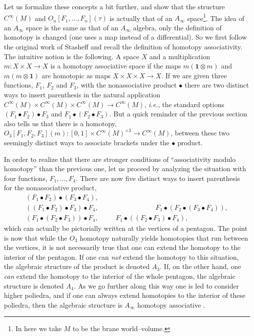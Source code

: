 \documentclass[a4paper,11pt]{article}
\begin{document}
Let us formalize these concepts a bit further, and show that the 
structure $C^{\infty}(M)$ and $O_{n}[F_{1}, \ldots, F_{n}](\tau)$ is 
actually that of an $A_{\infty}$ space\footnote{In here we take $M$ to 
be the brane world--volume.}. The idea of an $A_{\infty}$ 
space is the same as that of an $A_{\infty}$ algebra, only the definition 
of homotopy is changed (one uses a map instead of a differential). So 
we first follow the original work of Stasheff \cite{Stasheff} and 
recall the definition of homotopy associativity. The intuitive notion 
is the following. A space $X$ and a multiplication $m : X \times X \to 
X$ is a homotopy associative space if the maps $m(\mathbf{1} \otimes 
m)$ and $m(m \otimes \mathbf{1})$ are homotopic as maps $X \times X 
\times X \to X$. If we are given three functions, $F_{1}$, $F_{2}$ 
and $F_{3}$, with the nonassociative product $\bullet$ there are two 
distinct ways to insert parenthesis in the natural application 
$C^{\infty}(M) \times C^{\infty}(M) \times C^{\infty}(M) \to 
C^{\infty}(M)$, \textit{i.e.}, the standard options $\left( F_{1} 
\bullet F_{2} \right) \bullet F_{3}$ and $F_{1} \bullet \left( F_{2} \bullet 
F_{3} \right)$. But a quick reminder of the previous section also tells us 
that there is a homotopy, $O_{3} [F_{1}, F_{2}, F_{3}] (m) : [0,1] \times 
C^{\infty}(M)^{\times 3} \to C^{\infty}(M)$, between these two seemingly 
distinct ways to associate brackets under the $\bullet$ product.

In order to realize that there are stronger conditions of 
``associativity modulo homotopy'' than the previous one, let us 
proceed by analyzing the situation with four functions, $F_{1}, 
\ldots, F_{4}$. There are now five distinct ways to insert 
parenthesis for the nonassociative product,
\begin{eqnarray*}
&( F_{1} \bullet F_{2} ) \bullet ( F_{3} \bullet F_{4} ),& \\
&( ( F_{1} \bullet F_{2} ) \bullet F_{3} ) \bullet F_{4}, \;\;\;\;\;\; 
\;\;\;\;\;\; \;\;\;\;\;\; \;\;\;\;\;\; \;\;\;\;\;\;
F_{1} \bullet ( F_{2} \bullet ( F_{3} \bullet F_{4} ) ),& \\
&( F_{1} \bullet ( F_{2} \bullet F_{3} ) ) \bullet F_{4}, \;\;\; 
\;\;\; \;\;\;
F_{1} \bullet ( ( F_{2} \bullet F_{3} ) \bullet F_{4} ),&
\end{eqnarray*}
\noindent
which can actually be pictorially written at the vertices of a pentagon. 
The point is now that while the $O_{3}$ homotopy naturally yields 
homotopies that run between the vertices, it is not necessarily true 
that one can extend the homotopy to the interior of the pentagon. If 
one can \textit{not} extend the homotopy to this situation, the algebraic 
structure of the product is denoted $A_{3}$. If, on the other hand, 
one \textit{can} extend the homotopy to the interior of the whole pentagon, 
the algebraic structure is denoted $A_{4}$. As we go further along this way 
one is led to consider higher poliedra, and if one can always extend 
homotopies to the interior of these poliedra, then the algebraic 
structure is $A_{\infty}$ homotopy associative \cite{Stasheff}.
\end{document}
